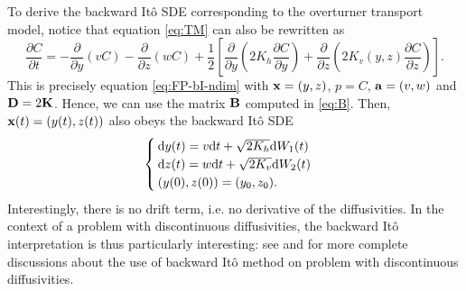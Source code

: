 To derive the backward Itô SDE corresponding to the overturner transport model, notice that equation \eqref{eq:TM} can also be rewritten as
\begin{equation}\label{eq:TM-bito}
	\frac{\partial C}{\partial t} = -\frac{\partial}{\partial y}(vC) -\frac{\partial}{\partial z}(wC) + \frac{1}{2}\left[\frac{\partial}{\partial y} \left(2K_h\frac{\partial C}{\partial y} \right) + \frac{\partial}{\partial z} \left(2K_v(y,z)\frac{\partial C}{\partial z}\right)\right].
\end{equation}
This is precisely equation \eqref{eq:FP-bI-ndim} with $\b x = (y,z)$, $p=C$, $\b a = (v,w)$ and $\b D = 2\b K$. Hence, we can use the matrix $\b B$ computed in \eqref{eq:B}. Then, $\b x(t) = (y(t),z(t))$ also obeys the backward Itô SDE
\begin{equation} \label{eq:bi-overturner}
	\begin{cases}
		\rm dy(t) = v \rm dt + \sqrt{2K_h}\rm dW_1(t)\\
		\rm dz(t) = w \rm dt + \sqrt{2K_v}\rm dW_2(t)\\
		(y(0),z(0)) = (y_0,z_0).
	\end{cases}
\end{equation}
Interestingly, there is no drift term, i.e. no derivative of the diffusivities. In the context of a problem with discontinuous diffusivities, the backward Itô interpretation is thus particularly interesting: see \cite{labolle2000diffusion} and \cite{spivakovskaya2007backward} for more complete discussions about the use of backward Itô method on problem with discontinuous diffusivities.